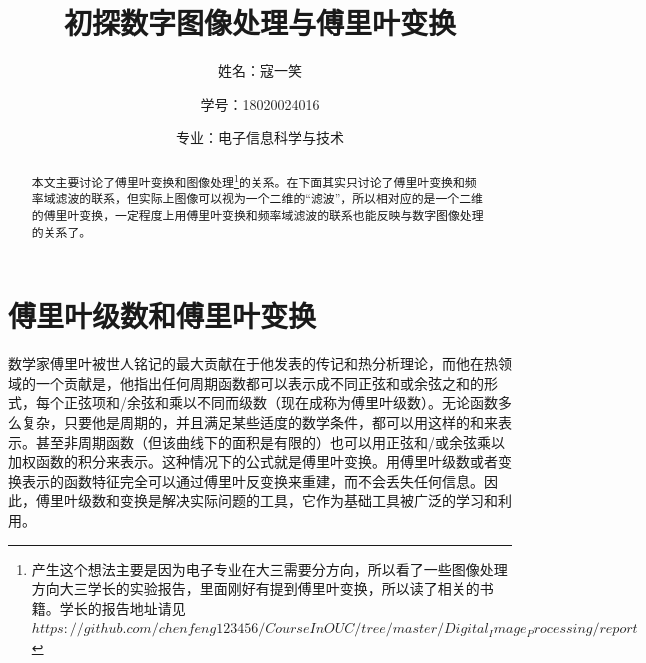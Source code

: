 \documentclass[UTF8,a4paper]{ctexart}
\title{初探数字图像处理与傅里叶变换}
\author{姓名：寇一笑 \protect\newline
\and 学号：18020024016 \\
\and 专业：电子信息科学与技术}
\begin{document}
\maketitle
\newcommand\blfootnote[1]{%
	\begingroup
	\renewcommand\thefootnote{}\footnote{#1}%
	\addtocounter{footnote}{-1}%
	\endgroup
}%
\begin{abstract}
	本文主要讨论了傅里叶变换和图像处理\footnote{产生这个想法主要是因为电子专业在大三需要分方向，所以看了一些图像处理方向大三学长的实验报告，里面刚好有提到傅里叶变换，所以读了相关的书籍。学长的报告地址请见$https://github.com/chenfeng123456/CourseInOUC/tree/master/Digital_Image_Processing/report$}的关系。在下面其实只讨论了傅里叶变换和频率域滤波的联系，但实际上图像可以视为一个二维的“滤波”，所以相对应的是一个二维的傅里叶变换，一定程度上用傅里叶变换和频率域滤波的联系也能反映与数字图像处理的关系了。
\end{abstract}

\section{傅里叶级数和傅里叶变换}
数学家傅里叶被世人铭记的最大贡献在于他发表的传记和热分析理论，而他在热领域的一个贡献是，他指出任何周期函数都可以表示成不同正弦和或余弦之和的形式，每个正弦项和/余弦和乘以不同而级数（现在成称为傅里叶级数）。无论函数多么复杂，只要他是周期的，并且满足某些适度的数学条件，都可以用这样的和来表示。甚至非周期函数（但该曲线下的面积是有限的）也可以用正弦和/或余弦乘以加权函数的积分来表示。这种情况下的公式就是傅里叶变换。用傅里叶级数或者变换表示的函数特征完全可以通过傅里叶反变换来重建，而不会丢失任何信息。因此，傅里叶级数和变换是解决实际问题的工具，它作为基础工具被广泛的学习和利用。\par
%
	
\end{document}
